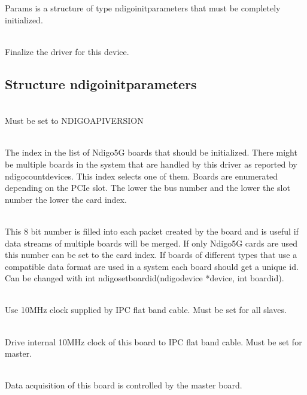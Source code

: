 		Params is a structure of type \textsf{ndigo\tu init\tu parameters} that must be completely initialized.\par
		
		\\
		Finalize the driver for this device.
	
		\subsection{Structure ndigo\tu init\tu parameters}
		
			\\
			Must be set to \textsf{NDIGO\tu API\tu VERSION}\par
			
			\\
			The index in the list of Ndigo5G boards that should be initialized. There might be multiple boards in the system that are handled by this driver as reported by \textsf{ndigo\tu count\tu devices}. This index selects one of them. Boards are enumerated depending on the PCIe slot. The lower the bus number and the lower the slot number the lower the card index.\par

			\\
			This 8 bit number is filled into each packet created by the board and is useful if data streams of multiple boards will be merged. If only Ndigo5G cards are used this number can be set to the card index. If boards of different types that use a compatible data format are used in a system each board should get a unique id. Can be changed with \textsf{int ndigo\tu set\tu board\tu id(ndigo\tu device *device, int board\tu id)}.\par
	
			\\
			Use 10MHz clock supplied by IPC flat band cable. Must be set for all slaves.\par
			
			\\
			Drive internal 10MHz clock of this board to IPC flat band cable. Must be set for master.\par

			\\
			Data acquisition of this board is controlled by the master board.\par

